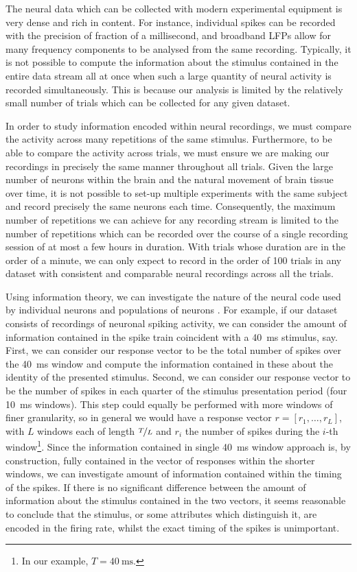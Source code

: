 The neural data which can be collected with modern experimental equipment is very dense and rich in content.
For instance, individual spikes can be recorded with the precision of fraction of a millisecond, and broadband \acp{LFP} allow for many frequency components to be analysed from the same recording.
Typically, it is not possible to compute the information about the stimulus contained in the entire data stream all at once when such a large quantity of neural activity is recorded simultaneously.
This is because our analysis is limited by the relatively small number of trials which can be collected for any given dataset.

In order to study information encoded within neural recordings, we must compare the activity across many repetitions of the same stimulus.
Furthermore, to be able to compare the activity across trials, we must ensure we are making our recordings in precisely the same manner throughout all trials.
Given the large number of neurons within the brain and the natural movement of brain tissue over time, it is not possible to set-up multiple experiments with the same subject and record precisely the same neurons each time.
Consequently, the maximum number of repetitions we can achieve for any recording stream is limited to the number of repetitions which can be recorded over the course of a single recording session of at most a few hours in duration.
With trials whose duration are in the order of a minute, we can only expect to record in the order of 100 trials in any dataset with consistent and comparable neural recordings across all the trials.

Using information theory, we can investigate the nature of the neural code used by individual neurons and populations of neurons \citep{Optican1987}.
For example, if our dataset consists of recordings of neuronal spiking activity, we can consider the amount of information contained in the spike train coincident with a \SI{40}{\milli\second} stimulus, say.
First, we can consider our response vector to be the total number of spikes over the \SI{40}{\milli\second} window and compute the information contained in these about the identity of the presented stimulus.
Second, we can consider our response vector to be the number of spikes in each quarter of the stimulus presentation period (four \SI{10}{\milli\second} windows).
This step could equally be performed with more windows of finer granularity, so in general we would have a response vector $r = [r_1, \ldots, r_L]$, with $L$ windows each of length $\nicefrac{T}{L}$ and $r_i$ the number of spikes during the $i$-th window\footnote{In our example, $T = \SI{40}{\milli\second}$.}.
Since the information contained in single \SI{40}{\milli\second} window approach is, by construction, fully contained in the vector of responses within the shorter windows, we can investigate amount of information contained within the timing of the spikes.
If there is no significant difference between the amount of information about the stimulus contained in the two vectors, it seems reasonable to conclude that the stimulus, or some attributes which distinguish it, are encoded in the firing rate, whilst the exact timing of the spikes is unimportant.

